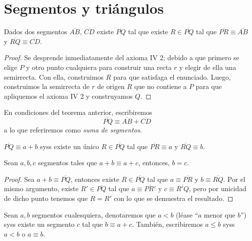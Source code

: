 \documentclass[11pt,a4paper]{book}
\begin{document}
\section{Segmentos y triángulos}
\begin{thm}
Dados dos segmentos $\overline{AB},\,\overline{CD}$ existe $\overline{PQ}$ tal que existe $R\in\overline{PQ}$ tal que $\overline{PR}\equiv\overline{AB}$ y $\overline{RQ}\equiv\overline{CD}$.
\end{thm}
\begin{proof}
Se desprende inmediatamente del axioma IV 2; debido a que primero se elige $P$ y otro punto cualquiera para construir una recta $r$ y elegir de ella una semirrecta. Con ella, construimos $R$ para que satisfaga el enunciado. Luego, construimos la semirrecta de $r$ de origen $R$ que no contiene a $P$ para que apliquemos el axioma IV 2 y construyamos $Q$.
\end{proof}
\begin{mydef}
En condiciones del teorema anterior, escribiremos
$$\overline{PQ}\equiv\overline{AB}+\overline{CD}$$
a lo que referiremos como \textit{suma de segmentos}.
\end{mydef}
\begin{thm}
$\overline{PQ}\equiv a+b$ syss existe un único $R\in\overline{PQ}$ tal que $\overline{PR}\equiv a$ y $\overline{RQ}\equiv b$.
\end{thm}
\begin{thm}
Sean $a,b,c$ segmentos tales que $a+b\equiv a+c$, entonces, $b=c$.
\end{thm}
\begin{proof}
Sea $a+b\equiv\overline{PQ}$, entonces existe $R\in\overline{PQ}$ tal que $a\equiv\overline{PR}$ y $b\equiv\overline{RQ}$. Por el mismo argumento, existe $R'\in\overline{PQ}$ tal que $a\equiv\overline{PR'}$ y $c\equiv\overline{R'Q}$, pero por unicidad de dicho punto tenemos que $R=R'$ con lo que se demuestra el resultado.
\end{proof}
\begin{mydef}
Sean $a,b$ segmentos cualesquiera, denotaremos que $a\lt b$  (léase ``$a$ menor que $b$'') syss existe un segmento $c$ tal que $b\equiv a+c$. También, escribiremos $a\leq b$ syss $a\lt b$ o $a\equiv b$.
\end{mydef}
\end{document}
